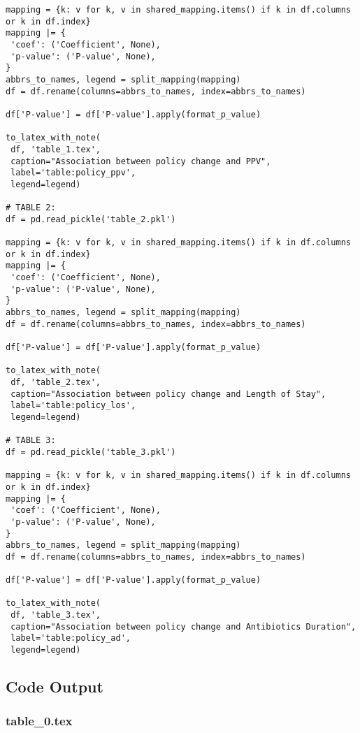 \documentclass[11pt]{article}
\begin{document}
\begin{verbatim}
mapping = {k: v for k, v in shared_mapping.items() if k in df.columns or k in df.index}
mapping |= {
 'coef': ('Coefficient', None),
 'p-value': ('P-value', None),
}
abbrs_to_names, legend = split_mapping(mapping)
df = df.rename(columns=abbrs_to_names, index=abbrs_to_names)

df['P-value'] = df['P-value'].apply(format_p_value)

to_latex_with_note(
 df, 'table_1.tex',
 caption="Association between policy change and PPV", 
 label='table:policy_ppv',
 legend=legend)

# TABLE 2:
df = pd.read_pickle('table_2.pkl')

mapping = {k: v for k, v in shared_mapping.items() if k in df.columns or k in df.index}
mapping |= {
 'coef': ('Coefficient', None),
 'p-value': ('P-value', None),
}
abbrs_to_names, legend = split_mapping(mapping)
df = df.rename(columns=abbrs_to_names, index=abbrs_to_names)

df['P-value'] = df['P-value'].apply(format_p_value)

to_latex_with_note(
 df, 'table_2.tex',
 caption="Association between policy change and Length of Stay", 
 label='table:policy_los',
 legend=legend)

# TABLE 3:
df = pd.read_pickle('table_3.pkl')

mapping = {k: v for k, v in shared_mapping.items() if k in df.columns or k in df.index}
mapping |= {
 'coef': ('Coefficient', None),
 'p-value': ('P-value', None),
}
abbrs_to_names, legend = split_mapping(mapping)
df = df.rename(columns=abbrs_to_names, index=abbrs_to_names)

df['P-value'] = df['P-value'].apply(format_p_value)

to_latex_with_note(
 df, 'table_3.tex',
 caption="Association between policy change and Antibiotics Duration",
 label='table:policy_ad',
 legend=legend)

\end{verbatim}



\subsection{Code Output}

\subsubsection*{table\_0.tex}
\end{document}
